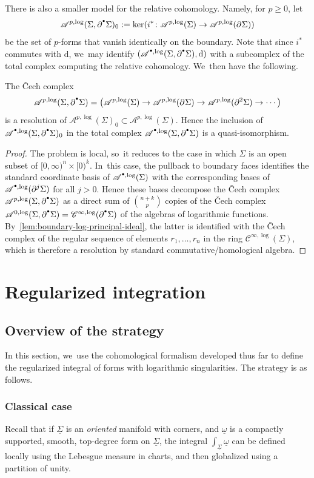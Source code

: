\documentclass[JEP,XML,SOM,Unicode,NoFloatCountersInSection,published]{cedram}
\let\oldbullet\bullet
\renewcommand{\bullet}{{\raisebox{1pt}{$\scriptscriptstyle\oldbullet$}}}
\theoremstyle{definition}
\theoremstyle{remark}
\newcommand{\halfspc}[1]{[0,\infty)^{#1}}
\renewcommand{\ge}{\geqslant}
\newcommand{\uomega}{\underline{\omega}}
\newcommand{\rbrac}[1]{\left(#1\right)}
\newcommand{\Cinflog}[1]{\mathscr{C}^{\infty,\log}_{#1}}
\newcommand{\dd}{\mathrm{d}}
\newcommand{\Alog}[2][\bullet]{\mathscr{A}^{#1,\log}(#2)}
\newcommand{\Sig}{\Sigma}
\newcommand{\uSig}{\underline{\Sigma}}
\newcommand{\bdSig}[1][]{\partial^{#1}\Sigma}
\begin{document}
There is also a smaller model for the relative cohomology. Namely, for $p \ge 0$, let
\[
\Alog[p]{\Sig,\bdSig[\bullet]}_0 := \ker (i^* \colon \Alog[p]{\Sig} \to \Alog[p]{\bdSig})
\]
be the set of $p$-forms that vanish identically on the boundary. Note that since $i^*$ commutes with $\dd$, we~may identify $(\Alog[\bullet]{\Sig,\bdSig[\bullet]},\dd)$ with a subcomplex of the total complex computing the relative cohomology. We~then have the following.
\begin{lemma}
\label{rem:continuous-relative-cohomology}
The \v{C}ech complex
\[
\Alog[p]{\Sig,\bdSig[\bullet]} = \rbrac{\Alog[p]{\Sig} \to \Alog[p]{\bdSig} \to \Alog[p]{\bdSig[2]} \to \cdots}
\]
is a resolution of $\Alog[p]{\Sig}_0 \subset \Alog[p]{\Sig}$. Hence the inclusion of $\Alog{\Sig,\bdSig[\bullet]}_0$ in the total complex $\Alog{\Sig,\bdSig[\bullet]}$ is a quasi-isomorphism.
\end{lemma}
\begin{proof}
The problem is local, so~it reduces to the case in which $\Sig$ is an open subset of $\halfspc{n}\times[0)^k$. In~this case, the pullback to boundary faces identifies the standard coordinate basis of $\Alog{\Sig}$ with the corresponding bases of $\Alog{\bdSig[j]}$ for all $j > 0$. Hence these bases decompose the \v{C}ech complex $\Alog[p]{\Sig,\bdSig[\bullet]}$ as a direct sum of $\binom{n+k}{p}$ copies of the \v{C}ech complex $\Alog[0]{\Sig,\bdSig[\bullet]} = \Cinflog{}(\bdSig[\bullet])$ of the algebras of logarithmic functions. By~\autoref{lem:boundary-log-principal-ideal}, the latter is identified with the \v{C}ech complex of the regular sequence of elements $r_1,\ldots,r_n$ in the ring $\Cinflog{}(\Sig)$, which is therefore a resolution by standard commutative/homological algebra.
\end{proof}

\section{Regularized integration}
\label{sec:integration}

\subsection{Overview of the strategy}
In this section, we~use the cohomological formalism developed thus far to define the regularized integral of forms with logarithmic singularities. The strategy is as follows.

\subsubsection{Classical case}\label{sec:classical-integral} Recall that if $\uSig$ is an \emph{oriented} manifold with corners, and $\uomega$ is a compactly supported, smooth, top-degree form on $\uSig$, the integral $\int_{\uSig} \uomega$ can be defined locally using the Lebesgue measure in charts, and then globalized using a partition of unity.
\end{document}
